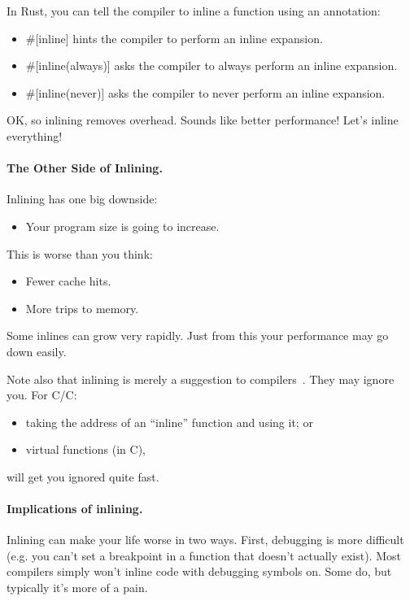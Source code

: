 \documentclass[a4paper]{report}
\newcommand{\CPP}{C\nolinebreak\hspace{-.05em}\raisebox{.4ex}{\tiny\bf +}\nolinebreak\hspace{-.10em}\raisebox{.4ex}{\tiny\bf +}}
\def\CPP{{C\nolinebreak[4]\hspace{-.05em}\raisebox{.4ex}{\tiny\bf ++}}}
\begin{document}
In Rust, you can tell the compiler to inline a function using an annotation:
\begin{itemize}[noitemsep]
 \item \#[inline] hints the compiler to perform an inline expansion.
 \item \#[inline(always)] asks the compiler to always perform an inline expansion.
 \item \#[inline(never)] asks the compiler to never perform an inline expansion.
\end{itemize}

OK, so inlining removes overhead. Sounds like better performance! Let's inline everything!


\paragraph{The Other Side of Inlining.}
Inlining has one big downside:
  \begin{itemize}
    \item Your program size is going to increase.
  \end{itemize}
   This is worse than you think:
      \begin{itemize}[noitemsep]
        \item Fewer cache hits.
        \item More trips to memory.
      \end{itemize}
   Some inlines can grow very rapidly.
  Just from this your performance may go down easily.

  Note also that inlining is merely a suggestion to compilers~\cite{gcc:inlining}.
  They may ignore you.
  For C/\CPP:
  \begin{itemize}[noitemsep]
    \item taking the address of an ``inline'' function and using it; or
    \item virtual functions (in \CPP),
  \end{itemize}
  will get you ignored quite fast.

\paragraph{Implications of inlining.} Inlining can make your life worse in two ways.
First, debugging is more difficult (e.g. you can't set a breakpoint in a function that
  doesn't actually exist).
 Most compilers simply won't inline code with debugging symbols on.
 Some do, but typically it's more of a pain.
\end{document}
